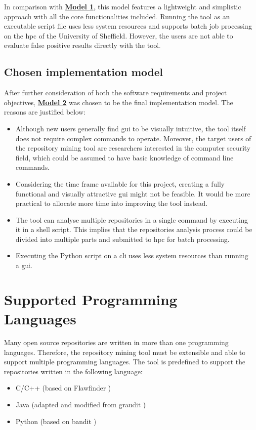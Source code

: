 \documentclass[12pt, a4paper]{report}
\begin{document}
In comparison with \hyperref[subsec:model1]{\textbf{Model 1}}, this model features a lightweight and
simplistic approach with all the core functionalities included. Running the tool as an executable
script file uses less system resources and supports batch job processing on the \acrshort{hpc} of
the University of Sheffield. However, the users are not able to evaluate false positive results
directly with the tool.

\subsection{Chosen implementation model}
After further consideration of both the software requirements and project objectives,
\hyperref[subsec:model2]{\textbf{Model 2}} was chosen to be the final implementation model. The
reasons are justified below:
\begin{itemize}
  \item Although new users generally find \acrshort{gui} to be visually intuitive, the tool itself
  does not require complex commands to operate. Moreover, the target users of the repository mining
  tool are researchers interested in the computer security field, which could be assumed to have
  basic knowledge of command line commands.
  \item Considering the time frame available for this project, creating a fully functional and
  visually attractive \acrshort{gui} might not be feasible. It would be more practical to allocate
  more time into improving the tool instead.
  \item The tool can analyse multiple repositories in a single command by executing it in a shell
  script. This implies that the repositories analysis process could be divided into multiple parts
  and submitted to \acrshort{hpc} for batch processing.
  \item Executing the Python script on a \acrshort{cli} uses less system resources than running a
  \acrshort{gui}.
\end{itemize}

\section{Supported Programming Languages}
Many open source repositories are written in more than one programming languages. Therefore, the
repository mining tool must be extensible and able to support multiple programming languages. The
tool is predefined to support the repositories written in the following language:
\begin{itemize}
  \item C/C++ (based on Flawfinder \cite{flawfinder})
  \item Java (adapted and modified from graudit \cite{graudit})
  \item Python (based on bandit \cite{bandit})
\end{itemize}
\end{document}

